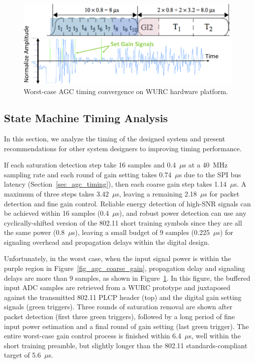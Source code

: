 \begin{figure}[p]
\centering
  \includegraphics[width=0.9\linewidth]{figs/agc/agc_timing_validation}   
    \caption{Worst-case AGC timing convergence on WURC hardware platform.}
\label{fig_agc_convergence}
\end{figure}
	
\subsection{State Machine Timing Analysis}
\label{sec_agc_timing_analysis}

	In this section, we analyze the timing of the designed system and present recommendations for other system designers to improving timing performance.

	If each saturation detection step take 16 samples and 0.4~$\mu$s at a 40~MHz sampling rate and each round of gain setting takes 0.74~$\mu$s due to the \ac{SPI} bus latency (Section~\ref{sec_agc_timing}), then each coarse gain step takes 1.14~$\mu$s.
	A maximum of three steps takes 3.42~$\mu$s, leaving a remaining 2.18~$\mu$s for packet detection and fine gain control.
	Reliable energy detection of high-SNR signals can be achieved within 16 samples (0.4~$\mu$s), and robust power detection can use any cyclically-shifted version of the 802.11 short training symbols since they are all the same power (0.8~$\mu$s), leaving a small budget of 9 samples (0.225~$\mu$s) for signaling overhead and propagation delays within the digital design.
	
	Unfortunately, in the worst case, when the input signal power is within the purple region in Figure~\ref{fig_agc_coarse_gain}, propagation delay and signaling delays are more than 9 samples, as shown in Figure~\ref{fig_agc_convergence}.
	In this figure, the buffered input \ac{ADC} samples are retrieved from a \ac{WURC} prototype and juxtaposed against the transmitted 802.11 \ac{PLCP} header (top) and the digital gain setting signals (green triggers).
	Three rounds of saturation removal are shown after packet detection (first three green triggers), followed by a long period of fine input power estimation and a final round of gain setting (last green trigger).
	The entire worst-case gain control process is finished within 6.4~$\mu$s, well within the short training preamble, but slightly longer than the 802.11 standards-compliant target of 5.6~$\mu$s.
	
